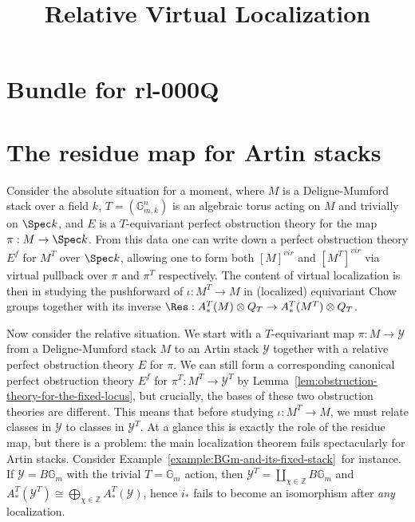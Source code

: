 \documentclass[12pt,dvipsnames]{amsart}
\title{Relative Virtual Localization}
\begin{document}
\section*{Bundle for rl-000Q}

\section{The residue map for Artin stacks}\label{rl-000Q}

Consider the absolute situation for a moment, where \(M\) is a Deligne-Mumford stack over a field \(k\), \(T = (\mathbb G_{m,k}^n)\) is an algebraic torus acting on \(M\) and trivially on \(\Spec k\), and \(E\) is a \(T\)-equivariant perfect obstruction theory for the map \(\pi:M\to \Spec k\). From this data one can write down a perfect obstruction theory \(E^f\) for \(M^T\) over \(\Spec k\), allowing one to form both \([M]^{vir}\) and \([M^T]^{vir}\) via virtual pullback over \(\pi\) and \(\pi^T\) respectively. The content of virtual localization is then in studying the pushforward of \(\iota:M^T\to M\) in (localized) equivariant Chow groups together with its inverse \(\Res:A^T_*(M)\otimes Q_T\to A^T_*(M^T)\otimes Q_T\).




Now consider the relative situation. We start with a \(T\)-equivariant map \(\pi:M\to \mathcal Y\) from a Deligne-Mumford stack \(M\) to an Artin stack \(\mathcal Y\) together with a relative perfect obstruction theory \(E\) for \(\pi\). We can still form a corresponding canonical perfect obstruction theory \(E^f\) for \(\pi^T:M^T\to \mathcal Y^T\) by Lemma~\ref{lem:obstruction-theory-for-the-fixed-locus}, but crucially, the bases of these two obstruction theories are different. This means that before studying \(\iota:M^T\to M\), we must relate classes in \(\mathcal Y\) to classes in \(\mathcal Y^T\). At a glance this is exactly the role of the residue map, but there is a problem: the main localization theorem fails spectacularly for Artin stacks. Consider Example~\ref{example:BGm-and-its-fixed-stack}~for instance. If \(\mathcal Y = B\mathbb G_m\) with the trivial \(T = \mathbb G_m\) action, then \(\mathcal Y^T = \coprod_{\chi\in \mathbb Z}B\mathbb G_m\) and \(A^T_*(\mathcal Y^T)\cong \bigoplus_{\chi\in \mathbb Z} A^T_*(\mathcal Y)\), hence \(i_*\) fails to become an isomorphism after \emph{any} localization.
\end{document}
